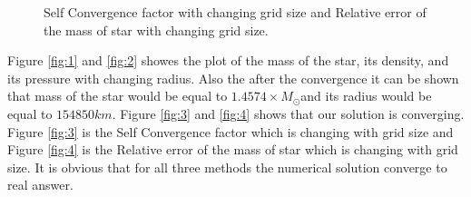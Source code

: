 \documentclass[10pt]{article}
\begin{document}
\begin{figure}[hbt]
  \centering
    \caption{ Self Convergence factor with changing grid size and Relative error of the mass of star with changing grid size.}
\end{figure}


Figure \ref{fig:1} and \ref{fig:2} showes the plot of the mass of the star, its density, and its pressure with changing radius. Also the after the convergence it can be shown that mass of the star would be equal to $1.4574 \times M_{\odot}$and its radius would be equal to $154850 km$.
Figure \ref{fig:3} and \ref{fig:4} shows that our solution is converging. Figure \ref{fig:3} is the Self Convergence factor which is changing with grid size and Figure \ref{fig:4} is the Relative error of the mass of star which is changing with grid size. It is obvious that for all three methods the numerical solution converge to real answer. \\
\end{document}
